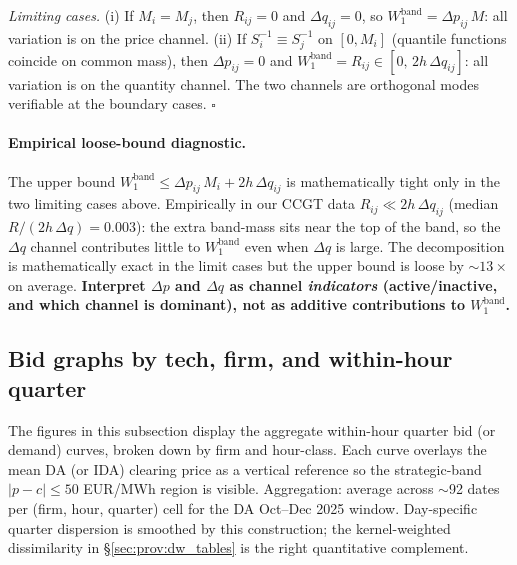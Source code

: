 \documentclass[11pt,a4paper]{article}
\newcommand{\code}[1]{\nolinkurl{#1}}
\begin{document}
\emph{Limiting cases.} (i) If $M_i = M_j$, then $R_{ij}=0$ and $\Delta q_{ij}=0$, so $W^{\text{band}}_1 = \Delta p_{ij}\,M$: all variation is on the price channel. (ii) If $S_i^{-1} \equiv S_j^{-1}$ on $[0, M_i]$ (quantile functions coincide on common mass), then $\Delta p_{ij}=0$ and $W^{\text{band}}_1 = R_{ij} \in [0,\,2h\,\Delta q_{ij}]$: all variation is on the quantity channel. The two channels are orthogonal modes verifiable at the boundary cases. \hfill$\square$

\paragraph{Empirical loose-bound diagnostic.}
The upper bound $W^{\text{band}}_1 \le \Delta p_{ij}\,M_i + 2h\,\Delta q_{ij}$ is mathematically tight only in the two limiting cases above. Empirically in our CCGT data $R_{ij} \ll 2h\,\Delta q_{ij}$ (median $R / (2h\,\Delta q) = 0.003$): the extra band-mass sits near the top of the band, so the $\Delta q$ channel contributes little to $W^{\text{band}}_1$ even when $\Delta q$ is large. The decomposition is mathematically exact in the limit cases but the upper bound is loose by $\sim 13\times$ on average. \textbf{Interpret $\Delta p$ and $\Delta q$ as channel \emph{indicators} (active/inactive, and which channel is dominant), not as additive contributions to $W^{\text{band}}_1$.}


\subsection{Bid graphs by tech, firm, and within-hour quarter}\label{sec:prov:bid_graphs}

\noindent The figures in this subsection display the aggregate within-hour quarter bid (or demand) curves, broken down by firm and hour-class. Each curve overlays the mean DA (or IDA) clearing price as a vertical reference so the strategic-band $|p - c| \le 50$ EUR/MWh region is visible. Aggregation: average across $\sim$92 dates per (firm, hour, quarter) cell for the DA Oct--Dec 2025 window. Day-specific quarter dispersion is smoothed by this construction; the kernel-weighted dissimilarity in \S\ref{sec:prov:dw_tables} is the right quantitative complement.
\end{document}
